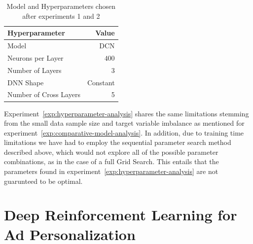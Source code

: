 \documentclass{mldsmsc}
\begin{document}
\begin{table}[h]
    \begin{tabular}{|l|r|}
        \hline
        \textbf{Hyperparameter} & \textbf{Value}\\
        \hline
        Model & DCN \\
        Neurons per Layer & $400$ \\
        Number of Layers & $3$ \\
        DNN Shape & Constant \\
        Number of Cross Layers & 5 \\
        \hline
    \end{tabular}
    \caption{Model and Hyperparameters chosen after experiments 1 and 2}
    \label{tab:deepctr-model-result}
\end{table}

Experiment~\ref{exp:hyperparameter-analysis} shares the same limitations stemming from
the small data sample size and target variable imbalance as mentioned for experiment~\ref{exp:comparative-model-analysis}.
In addition, due to training time limitations we have had to employ the sequential parameter search
method described above, which would not explore all of the possible parameter combinations, as in the case
of a full Grid Search. This entails that the parameters found in experiment~\ref{exp:hyperparameter-analysis}
are not guarunteed to be optimal.

\chapter{Deep Reinforcement Learning for Ad Personalization}
\label{chap:deep-rl-for-ad-personalization}
\end{document}
